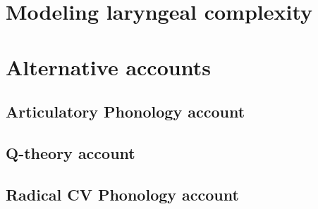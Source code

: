 \section{Modeling laryngeal complexity}\label{sec:modeling_lc}

\section{Alternative accounts}\label{sec:alternative_accounts}

\subsection{Articulatory Phonology account}\label{sec:ap_account}

\subsection{Q-theory account}\label{sec:q_theory_account}

\subsection{Radical CV Phonology account}\label{sec:rcv_account}
